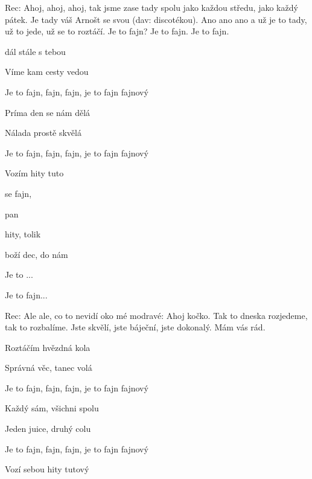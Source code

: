 


Rec: Ahoj, ahoj, ahoj, tak jsme zase tady spolu jako každou středu, jako každý pátek. Je tady váš Arnošt se svou (dav: discotékou). Ano ano ano a už je to tady, už to jede, už se to roztáčí. Je to fajn? Je to fajn. Je to fajn.




\zs
{} dál stále s tebou

Víme kam cesty vedou

Je to fajn, fajn, fajn, je to fajn fajnový

\ks

\zs

Príma den se nám dělá

Nálada prostě skvělá

Je to fajn, fajn, fajn, je to fajn fajnový

Vozím  hity tuto
\ks




\zr
{} se  fajn,  

  pan 

  hity,  tolik 

 boží dec, do  nám 

Je to ...

Je to fajn...
\kr

Rec: Ale ale, co to nevidí oko mé modravé: Ahoj kočko. Tak to dneska rozjedeme, tak to rozbalíme. Jste skvělí, jste báječní, jste dokonalý. Mám vás rád.


\zs
Roztáčím hvězdná kola

Správná věc, tanec volá

Je to fajn, fajn, fajn, je to fajn fajnový
\ks

\zs
Každý sám, všichni spolu

Jeden juice, druhý colu

Je to fajn, fajn, fajn, je to fajn fajnový

Vozí sebou hity tutový
\ks

\zr \kr

\zr \kr

\kp

